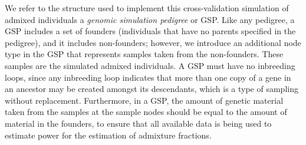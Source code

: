We refer to the structure used to implement this cross-validation simulation 
of admixed individuals
a {\em genomic simulation pedigree} or GSP.  Like any pedigree,
a GSP includes a set of founders (individuals that have no parents specified in the
pedigree), and it includes non-founders; however, we introduce an additional node
type in the GSP that represents samples taken from the non-founders. These samples
are the simulated admixed individuals.  A GSP must have no inbreeding loops, since
any inbreeding loop indicates that more than one copy of a gene in an ancestor may
be created amongst its descendants, which is a type of sampling without
replacement.  Furthermore, in a GSP, the amount of genetic material taken from the
samples at the sample nodes should be equal to the amount of material in the founders,
to ensure that all available data is being used to estimate power for the estimation of
admixture fractions.


